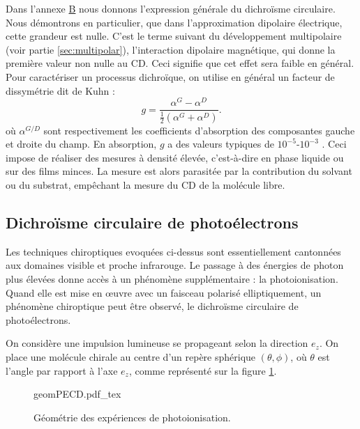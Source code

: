 Dans l'annexe \hyperref[ann:dichroisme]{B} nous donnons l'expression générale du dichroïsme circulaire. Nous démontrons en particulier, que dans l'approximation dipolaire électrique, cette grandeur est nulle. C'est le terme suivant du développement multipolaire (voir partie \ref{sec:multipolar}), l'interaction dipolaire magnétique, qui donne la première valeur non nulle au CD. Ceci signifie que cet effet sera faible en général. Pour caractériser un processus dichroïque, on utilise en général un facteur de dissymétrie dit de Kuhn  :
\begin{equation}
g = \frac{\alpha^{G}-\alpha^{D}}{\frac{1}{2}(\alpha^{G}+\alpha^{D})}.
\label{eq:kuhn}
\end{equation}
où $\alpha^{G/D}$ sont respectivement les coefficients d'absorption des composantes gauche et droite du champ.
En absorption, $g$ a des valeurs typiques de $10^{-5}\text{-}10^{-3}$ . Ceci impose de réaliser des mesures à densité élevée, c'est-à-dire en phase liquide ou sur des films minces. La mesure est alors parasitée par la contribution du solvant ou du substrat, empêchant la mesure du CD de la molécule libre.

\subsection{Dichroïsme circulaire de photoélectrons}
Les techniques chiroptiques evoquées ci-dessus sont essentiellement cantonnées aux domaines visible et proche infrarouge. Le passage à des énergies de photon plus élevées donne accès à un phénomène supplémentaire : la photoionisation. Quand elle est mise en œuvre avec un faisceau polarisé elliptiquement, un phénomène chiroptique peut être observé, le dichroïsme circulaire de photoélectrons.

On considère une impulsion lumineuse se propageant selon la direction $e_z$. On place une molécule chirale au centre d'un repère sphérique $(\theta,\phi)$, où $\theta$ est l'angle par rapport à l'axe $e_z$, comme représenté sur la figure \ref{fig:geomPECD}.

\begin{figure}[!ht]
\centering
\def\svgwidth{0.5\columnwidth}
{geomPECD.pdf_tex}
\caption{Géométrie des expériences de photoionisation.}
\label{fig:geomPECD}
\end{figure}

